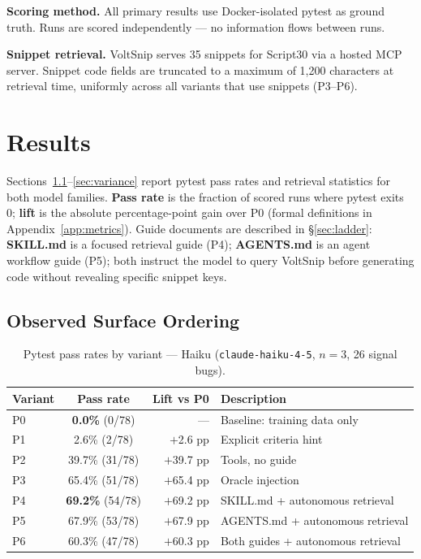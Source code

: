 \documentclass[10pt,a4paper,twocolumn]{article}
\begin{document}
\textbf{Scoring method.}
All primary results use Docker-isolated pytest as ground truth.
Runs are scored independently --- no information flows between runs.

\textbf{Snippet retrieval.}
VoltSnip serves 35 snippets for Script30 via a hosted MCP server.
Snippet code fields are truncated to a maximum of 1,200 characters at
retrieval time, uniformly across all variants that use snippets (P3--P6).

\section{Results}
\label{sec:results}

Sections~\ref{sec:surface-hierarchy}--\ref{sec:variance} report pytest
pass rates and retrieval statistics for both model families.
\textbf{Pass rate} is the fraction of scored runs where pytest exits 0;
\textbf{lift} is the absolute percentage-point gain over P0 (formal
definitions in Appendix~\ref{app:metrics}).
Guide documents are described in \S\ref{sec:ladder}: \textbf{SKILL.md}
is a focused retrieval guide (P4); \textbf{AGENTS.md} is an agent
workflow guide (P5); both instruct the model to query VoltSnip before
generating code without revealing specific snippet keys.

\subsection{Observed Surface Ordering}
\label{sec:surface-hierarchy}

\begin{table}[H]
\centering
\caption{Pytest pass rates by variant --- Haiku
(\texttt{claude-haiku-4-5}, $n{=}3$, 26 signal bugs).}
\label{tab:results-haiku}
\small
\begin{tabular}{@{}lcrl@{}}
\toprule
\textbf{Variant} & \textbf{Pass rate} & \textbf{Lift vs P0} & \textbf{Description} \\
\midrule
P0 & \textbf{0.0\%} (0/78)   & ---        & Baseline: training data only \\
P1 & 2.6\% (2/78)            & $+$2.6 pp  & Explicit criteria hint \\
P2 & 39.7\% (31/78)          & $+$39.7 pp & Tools, no guide \\
P3 & 65.4\% (51/78)          & $+$65.4 pp & Oracle injection \\
P4 & \textbf{69.2\%} (54/78) & $+$69.2 pp & SKILL.md + autonomous retrieval \\
P5 & 67.9\% (53/78)          & $+$67.9 pp & AGENTS.md + autonomous retrieval \\
P6 & 60.3\% (47/78)          & $+$60.3 pp & Both guides + autonomous retrieval \\
\bottomrule
\end{tabular}
\end{table}
\end{document}
